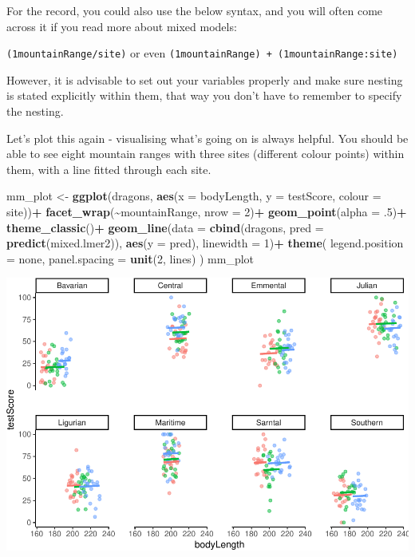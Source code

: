 \documentclass[
]{article}
\newenvironment{Shaded}{\begin{snugshade}}{\end{snugshade}}
\newcommand{\AttributeTok}[1]{\textcolor[rgb]{0.13,0.29,0.53}{#1}}
\newcommand{\DecValTok}[1]{\textcolor[rgb]{0.00,0.00,0.81}{#1}}
\newcommand{\FunctionTok}[1]{\textcolor[rgb]{0.13,0.29,0.53}{\textbf{#1}}}
\newcommand{\NormalTok}[1]{#1}
\newcommand{\OtherTok}[1]{\textcolor[rgb]{0.56,0.35,0.01}{#1}}
\newcommand{\SpecialCharTok}[1]{\textcolor[rgb]{0.81,0.36,0.00}{\textbf{#1}}}
\newcommand{\StringTok}[1]{\textcolor[rgb]{0.31,0.60,0.02}{#1}}
\begin{document}
For the record, you could also use the below syntax, and you will often
come across it if you read more about mixed models:

\texttt{(1\textbar{}mountainRange/site)} or even
\texttt{(1\textbar{}mountainRange)\ +\ (1\textbar{}mountainRange:site)}

However, it is advisable to set out your variables properly and make
sure nesting is stated explicitly within them, that way you don't have
to remember to specify the nesting.

Let's plot this again - visualising what's going on is always helpful.
You should be able to see eight mountain ranges with three sites
(different colour points) within them, with a line fitted through each
site.

\begin{Shaded}
\begin{Highlighting}[]
\NormalTok{mm\_plot }\OtherTok{\textless{}{-}} \FunctionTok{ggplot}\NormalTok{(dragons, }\FunctionTok{aes}\NormalTok{(}\AttributeTok{x =}\NormalTok{ bodyLength, }\AttributeTok{y =}\NormalTok{ testScore, }\AttributeTok{colour =}\NormalTok{ site))}\SpecialCharTok{+}
  \FunctionTok{facet\_wrap}\NormalTok{(}\SpecialCharTok{\textasciitilde{}}\NormalTok{mountainRange, }\AttributeTok{nrow =} \DecValTok{2}\NormalTok{)}\SpecialCharTok{+}
  \FunctionTok{geom\_point}\NormalTok{(}\AttributeTok{alpha =}\NormalTok{ .}\DecValTok{5}\NormalTok{)}\SpecialCharTok{+}
  \FunctionTok{theme\_classic}\NormalTok{()}\SpecialCharTok{+}
  \FunctionTok{geom\_line}\NormalTok{(}\AttributeTok{data =} \FunctionTok{cbind}\NormalTok{(dragons, }\AttributeTok{pred =} \FunctionTok{predict}\NormalTok{(mixed.lmer2)), }\FunctionTok{aes}\NormalTok{(}\AttributeTok{y =}\NormalTok{ pred), }\AttributeTok{linewidth =} \DecValTok{1}\NormalTok{)}\SpecialCharTok{+}
  \FunctionTok{theme}\NormalTok{(}
    \AttributeTok{legend.position =} \StringTok{\textquotesingle{}none\textquotesingle{}}\NormalTok{,}
    \AttributeTok{panel.spacing =} \FunctionTok{unit}\NormalTok{(}\DecValTok{2}\NormalTok{, }\StringTok{\textquotesingle{}lines\textquotesingle{}}\NormalTok{)}
\NormalTok{  )}
\NormalTok{mm\_plot}
\end{Highlighting}
\end{Shaded}

\includegraphics{Introduction-to-linear-mixed-models_files/figure-latex/unnamed-chunk-20-1.pdf}
\end{document}
